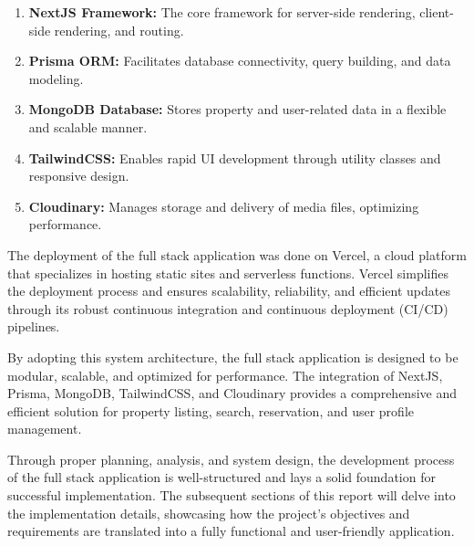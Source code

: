 \begin{enumerate}
	\item \textbf{NextJS Framework:} The core framework for server-side rendering, client-side rendering, and routing.
	\item \textbf{Prisma ORM:} Facilitates database connectivity, query building, and data modeling.
	\item \textbf{MongoDB Database:} Stores property and user-related data in a flexible and scalable manner.
	\item \textbf{TailwindCSS:} Enables rapid UI development through utility classes and responsive design.
	\item \textbf{Cloudinary:} Manages storage and delivery of media files, optimizing performance.
\end{enumerate}

The deployment of the full stack application was done on Vercel, a cloud platform that specializes in hosting static sites and serverless functions. Vercel simplifies the deployment process and ensures scalability, reliability, and efficient updates through its robust continuous integration and continuous deployment (CI/CD) pipelines.

By adopting this system architecture, the full stack application is designed to be modular, scalable, and optimized for performance. The integration of NextJS, Prisma, MongoDB, TailwindCSS, and Cloudinary provides a comprehensive and efficient solution for property listing, search, reservation, and user profile management.

Through proper planning, analysis, and system design, the development process of the full stack application is well-structured and lays a solid foundation for successful implementation. The subsequent sections of this report will delve into the implementation details, showcasing how the project's objectives and requirements are translated into a fully functional and user-friendly application.